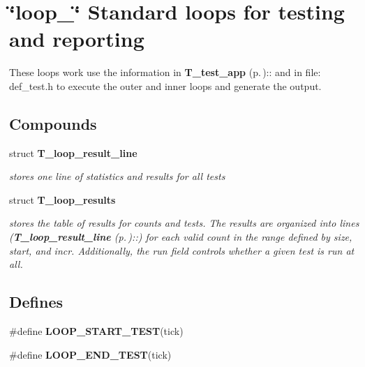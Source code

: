 \section{\char`\"{}loop\_\-\char`\"{} Standard loops for testing and reporting}
\label{group__loop__test}
These loops work use the information in {\bf T\_\-test\_\-app} {\rm (p.\,\pageref{structT__test__app})}:: and in file: def\_\-test.h to execute the outer and inner loops and generate the output. 
\subsection*{Compounds}
\begin{CompactItemize}
\item 
struct {\bf T\_\-loop\_\-result\_\-line}
\begin{CompactList}\small\item\em stores one line of statistics and results for all tests\item\end{CompactList}\item 
struct {\bf T\_\-loop\_\-results}
\begin{CompactList}\small\item\em stores the table of results for counts and tests. The results are organized into lines ({\bf T\_\-loop\_\-result\_\-line} {\rm (p.\,\pageref{structT__loop__result__line})}::) for each valid count in the range defined by size, start, and incr. Additionally, the run field controls whether a given test is run at all.\item\end{CompactList}\end{CompactItemize}
\subsection*{Defines}
\begin{CompactItemize}
\item 
\#define {\bf LOOP\_\-START\_\-TEST}(tick)
\item 
\#define {\bf LOOP\_\-END\_\-TEST}(tick)
\end{CompactItemize}
